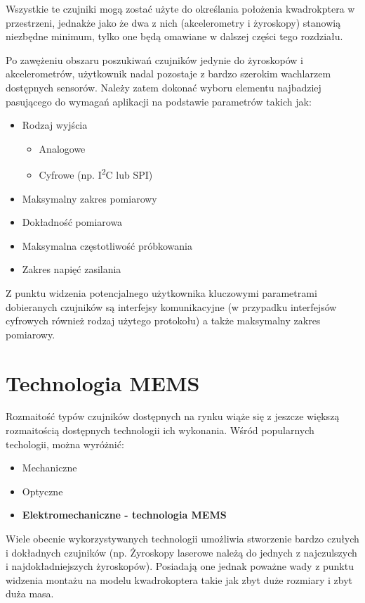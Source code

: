 Wszystkie te czujniki mogą zostać użyte do określania położenia kwadrokptera w przestrzeni, jednakże jako że dwa z nich (akcelerometry i żyroskopy) stanowią niezbędne minimum, tylko one będą omawiane w dalszej części tego rozdziału.

Po zawężeniu obszaru poszukiwań czujników jedynie do żyroskopów i akcelerometrów, użytkownik nadal pozostaje z bardzo szerokim wachlarzem dostępnych sensorów. Należy zatem dokonać wyboru elementu najbadziej pasującego do wymagań aplikacji na podstawie parametrów takich jak:

\begin{itemize}
	\item Rodzaj wyjścia
		\begin{itemize}
			\item Analogowe
			\item Cyfrowe (np. I\textsuperscript{2}C lub SPI)
		\end{itemize}
	\item Maksymalny zakres pomiarowy
	\item Dokładność pomiarowa
	\item Maksymalna częstotliwość próbkowania
	\item Zakres napięć zasilania
\end{itemize}

Z punktu widzenia potencjalnego użytkownika kluczowymi parametrami dobieranych czujników są interfejsy komunikacyjne (w przypadku interfejsów cyfrowych również rodzaj użytego protokołu) a także maksymalny zakres pomiarowy.

\section{Technologia MEMS}

Rozmaitość typów czujników dostępnych na rynku wiąże się z jeszcze większą rozmaitością dostępnych technologii ich wykonania. Wśród popularnych techologii, można wyróżnić:

\begin{itemize}
	\item Mechaniczne
	\item Optyczne
	\item \textbf{Elektromechaniczne - technologia MEMS}
\end{itemize}

Wiele obecnie wykorzystywanych technologii umożliwia stworzenie bardzo czułych i dokładnych czujników (np. Żyroskopy laserowe należą do jednych z najczulszych i najdokładniejszych żyroskopów). Posiadają one jednak poważne wady z punktu widzenia montażu na modelu kwadrokoptera takie jak zbyt duże rozmiary i zbyt duża masa. 

